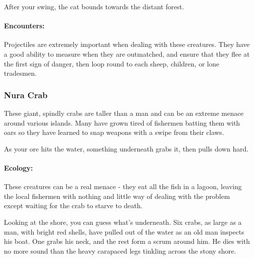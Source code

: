 \begin{multicols}{2}
\begin{boxtext}
	After your swing, the cat bounds towards the distant forest.

\end{boxtext}

\paragraph{Encounters:} Projectiles are extremely important when dealing with these creatures.
They have a good ability to measure when they are outmatched, and ensure that they flee at the first sign of danger, then loop round to each sheep, children, or lone tradesmen.

\nuracat

\subsubsection{Nura Crab}\label{nura_crab}

These giant, spindly crabs are taller than a man and can be an extreme menace around various islands.
Many have grown tired of fishermen batting them with oars so they have learned to snap weapons with a swipe from their claws.

\begin{boxtext}

	As your ore hits the water, something underneath grabs it, then pulls down hard.

\end{boxtext}

\paragraph{Ecology:} These creatures can be a real menace - they eat all the fish in a lagoon, leaving the local fishermen with nothing and little way of dealing with the problem except waiting for the crab to starve to death.

\begin{boxtext}

	Looking at the shore, you can guess what's underneath.
	Six crabs, as large as a man, with bright red shells, have pulled out of the water as an old man inspects his boat.
	One grabs his neck, and the rest form a scrum around him.
	He dies with no more sound than the heavy carapaced legs tinkling across the stony shore.

\end{boxtext}



\end{multicols}
